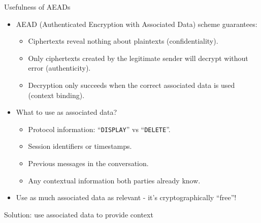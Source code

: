 \documentclass[aspectratio=169, lualatex, handout]{beamer}
\begin{document}
\begin{frame}{Usefulness of AEADs}
	\begin{itemize}[<+->]
		\item AEAD (Authenticated Encryption with Associated Data) scheme guarantees:
		      \begin{itemize}
			      \item Ciphertexts reveal nothing about plaintexts (confidentiality).
			      \item Only ciphertexts created by the legitimate sender will decrypt without error (authenticity).
			      \item Decryption only succeeds when the correct associated data is used (context binding).
		      \end{itemize}
		\item What to use as associated data?
		      \begin{itemize}
			      \item Protocol information: ``\texttt{DISPLAY}'' vs ``\texttt{DELETE}''.
			      \item Session identifiers or timestamps.
			      \item Previous messages in the conversation.
			      \item Any contextual information both parties already know.
		      \end{itemize}
		\item Use as much associated data as relevant - it's cryptographically ``free''!
	\end{itemize}
\end{frame}

\begin{frame}{Solution: use associated data to provide context}
\end{frame}

\begin{frame}[plain]
	\titlepage
\end{frame}
\end{document}
